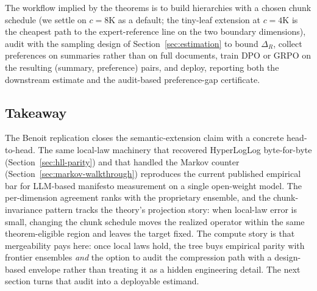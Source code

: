The workflow implied by the theorems is to build hierarchies with a chosen chunk schedule (we settle on $c = 8\mathrm{K}$ as a default; the tiny-leaf extension at $c = 4\mathrm{K}$ is the cheapest path to the expert-reference line on the two boundary dimensions), audit with the sampling design of Section~\ref{sec:estimation} to bound $\Delta_R$, collect preferences on summaries rather than on full documents, train DPO or GRPO on the resulting (summary, preference) pairs, and deploy, reporting both the downstream estimate and the audit-based preference-gap certificate.

\subsection{Takeaway}

The Benoit replication closes the semantic-extension claim with a
concrete head-to-head. The same local-law machinery that recovered
HyperLogLog byte-for-byte (Section~\ref{sec:hll-parity}) and that
handled the Markov counter (Section~\ref{sec:markov-walkthrough})
reproduces the current published empirical bar for LLM-based
manifesto measurement on a single open-weight model. The per-dimension
agreement ranks with the proprietary ensemble, and the chunk-invariance
pattern tracks the theory's projection story: when local-law error is
small, changing the chunk schedule moves the realized operator within the
same theorem-eligible region and leaves the target fixed. The compute
story is that mergeability pays here: once local laws hold, the tree
buys empirical parity with frontier ensembles \emph{and} the option to
audit the compression path with a design-based envelope rather than
treating it as a hidden engineering detail. The next section turns
that audit into a deployable estimand.
